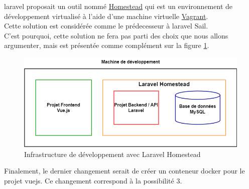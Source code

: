 \documentclass[
    iai, %
    il, %
]{heig-tb}
\begin{document}
\Gls{laravel} proposait un outil nommé \href{https://laravel.com/docs/9.x/homestead}{Homestead} qui est un environnement de développement virtualisé à l'aide d'une machine virtuelle \href{https://www.vagrantup.com/}{Vagrant}. \\
Cette solution est considérée comme le prédecesseur à \Gls{laravel} Sail.\\
C'est pourquoi, cette solution ne fera pas parti des choix que nous allons argumenter, mais est
présentée comme complément sur la figure \ref{infrastructure-dev-laravel-homestead.drawio}.


\begin{center}
    \begin{figure}
        \includegraphics[width=\textwidth]{./assets/figures/infrastructure-dev-laravel-homestead.drawio.png}
        \caption{Infrastructure de développement avec Laravel Homestead \label{infrastructure-dev-laravel-homestead.drawio}}
    \end{figure}
\end{center}

Finalement, le dernier changement serait de créer un \Gls{conteneur} \Gls{docker} pour le projet \Gls{vuejs}. Ce changement correspond à la possibilité 3.


\clearpage

\end{document}
